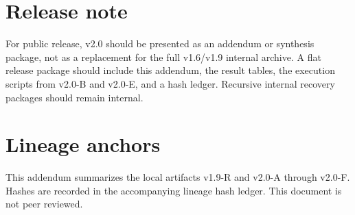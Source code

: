 \documentclass[11pt,a4paper]{article}
\begin{document}
\section{Release note}
For public release, v2.0 should be presented as an addendum or synthesis package, not as a replacement for the full v1.6/v1.9 internal archive. A flat release package should include this addendum, the result tables, the execution scripts from v2.0-B and v2.0-E, and a hash ledger. Recursive internal recovery packages should remain internal.

\section*{Lineage anchors}
This addendum summarizes the local artifacts v1.9-R and v2.0-A through v2.0-F. Hashes are recorded in the accompanying lineage hash ledger. This document is not peer reviewed.
\end{document}

